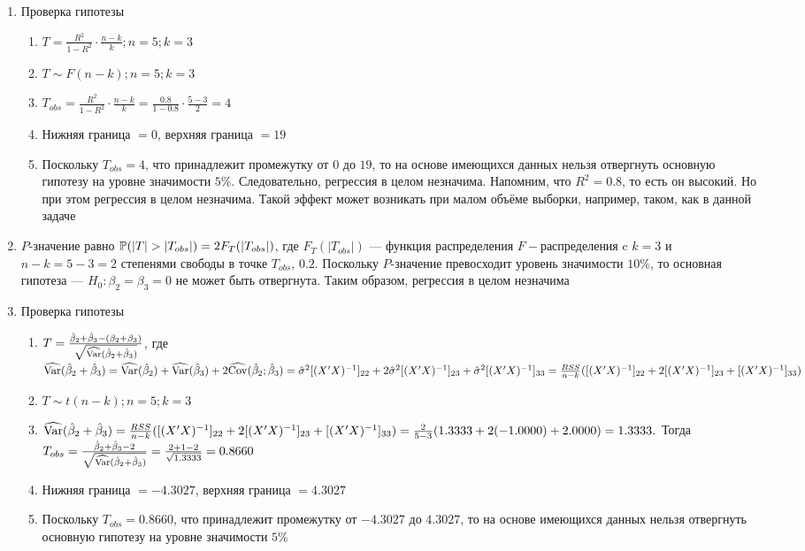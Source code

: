 \begin{problem}
\begin{sol}
\begin{enumerate}
\item Проверка гипотезы
\begin{enumerate}
\item $T = \frac{R^2}{1 - R^2} \cdot \frac{n-k}{k}; n = 5; k = 3$
\item $T \sim F(n-k); n = 5; k = 3$
\item $T_{obs} = \frac{R^2}{1 - R^2} \cdot \frac{n-k}{k} = \frac{0.8}{1 - 0.8} \cdot \frac{5-3}{2} = 4$
\item Нижняя граница $= 0$, верхняя граница $= 19$
\item Поскольку $T_{obs} = 4$, что принадлежит промежутку от $0$ до $19$, то на основе имеющихся данных нельзя отвергнуть основную гипотезу на уровне значимости $5\%$. Следовательно, регрессия в целом незначима. Напомним, что $R^2 = 0.8$, то есть он высокий. Но при этом регрессия в целом незначима. Такой эффект может возникать при малом объёме выборки, например, таком, как в данной задаче
\end{enumerate}
\item $P$-значение равно $\P (|T|>|T_{obs}|) = 2F_{T}(|T_{obs}|)$, где $F_{T}(|T_{obs}|)$ — функция распределения $F-$распределения c $k = 3$ и $n - k = 5 - 3 = 2$ степенями свободы в точке $T_{obs}$, $0.2$. Поскольку $P$-значение превосходит уровень значимости $10\%$, то основная гипотеза — $H_0: \beta_2 = \beta_3 = 0$ не может быть отвергнута. Таким образом, регрессия в целом незначима
\item Проверка гипотезы
\begin{enumerate}
\item $T = \frac{\hat{\beta}_2 + \hat{\beta}_3 - (\beta_2 + \beta_3)}{\sqrt{\widehat{\operatorname{Var}}(\hat{\beta}_2 + \hat{\beta}_3)}}$, где $\widehat{\operatorname{Var}}(\hat{\beta}_2 + \hat{\beta}_3) = \widehat{\operatorname{Var}}(\hat{\beta}_2) + \widehat{\operatorname{Var}}(\hat{\beta}_3) + 2\widehat{\operatorname{Cov}}(\hat{\beta}_2;\hat{\beta}_3) = \hat{\sigma}^2 [(X'X)^{-1}]_{22} + 2\hat{\sigma}^2 [(X'X)^{-1}]_{23} + \hat{\sigma}^2 [(X'X)^{-1}]_{33}= \frac{RSS}{n - k}([(X'X)^{-1}]_{22} + 2[(X'X)^{-1}]_{23} + [(X'X)^{-1}]_{33})$
\item $T \sim t(n-k); n = 5; k = 3$
\item $\widehat{\operatorname{Var}}(\hat{\beta}_2 + \hat{\beta}_3) = \frac{RSS}{n - k}([(X'X)^{-1}]_{22} + 2[(X'X)^{-1}]_{23} + [(X'X)^{-1}]_{33}) = \frac{2}{5 - 3} (1.3333 + 2(-1.0000) + 2.0000) = 1.3333.$ Тогда $T_{obs} = \frac{\hat{\beta}_2 + \hat{\beta}_3 - 2}{\sqrt{\widehat{\operatorname{Var}}(\hat{\beta}_2 + \hat{\beta}_3)}} = \frac{2 + 1 - 2}{\sqrt{1.3333}} = 0.8660$
\item Нижняя граница $= - 4.3027$, верхняя граница $= 4.3027$
\item Поскольку $T_{obs} = 0.8660$, что принадлежит промежутку от $- 4.3027$ до $4.3027$, то на основе имеющихся данных нельзя отвергнуть основную гипотезу на уровне значимости $5\%$

\end{enumerate}
\end{enumerate}
\end{sol}
\end{problem}
